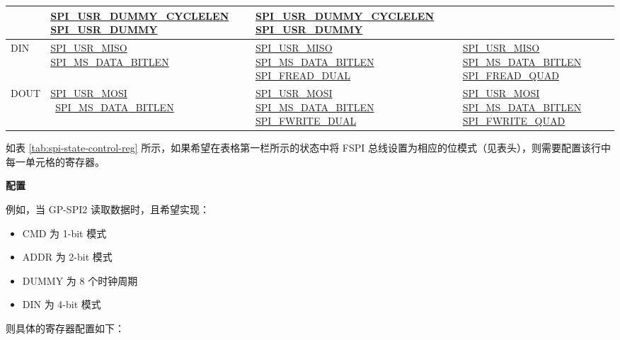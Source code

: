 \documentclass[main\_\_CN.tex]{subfiles}
\begin{document}
\begin{longtable}[c]{ |L{1.3cm}|L{4.8cm}|L{4.8cm}|L{4.8cm}| }
     &\hyperref[fielddesc:SPIUSRDUMMYCYCLELEN]{SPI\_USR\_DUMMY\_CYCLELEN}    \hyperref[fielddesc:SPIUSRDUMMY]{SPI\_USR\_DUMMY} &
    \hyperref[fielddesc:SPIUSRDUMMYCYCLELEN]{SPI\_USR\_DUMMY\_CYCLELEN}    \hyperref[fielddesc:SPIUSRDUMMY]{SPI\_USR\_DUMMY}\\
     \hline
DIN  &\hyperref[fielddesc:SPIUSRMISO]{SPI\_USR\_MISO}
      \hyperref[fielddesc:SPIMSDATABITLEN]{SPI\_MS\_DATA\_BITLEN}
     &\hyperref[fielddesc:SPIUSRMISO]{SPI\_USR\_MISO}
     \hyperref[fielddesc:SPIMSDATABITLEN]{SPI\_MS\_DATA\_BITLEN}
    \hyperref[fielddesc:SPIFREADDUAL]{SPI\_FREAD\_DUAL}
     &\hyperref[fielddesc:SPIUSRMISO]{SPI\_USR\_MISO}
     \hyperref[fielddesc:SPIMSDATABITLEN]{SPI\_MS\_DATA\_BITLEN}
    \hyperref[fielddesc:SPIFREADQUAD]{SPI\_FREAD\_QUAD}\\
     \hline
DOUT &\hyperref[fielddesc:SPIUSRMOSI]{SPI\_USR\_MOSI}       \
      \hyperref[fielddesc:SPIMSDATABITLEN]{SPI\_MS\_DATA\_BITLEN}
     &\hyperref[fielddesc:SPIUSRMOSI]{SPI\_USR\_MOSI}
     \hyperref[fielddesc:SPIMSDATABITLEN]{SPI\_MS\_DATA\_BITLEN}      \hyperref[fielddesc:SPIFWRITEDUAL]{SPI\_FWRITE\_DUAL} &
    \hyperref[fielddesc:SPIUSRMOSI]{SPI\_USR\_MOSI}
     \hyperref[fielddesc:SPIMSDATABITLEN]{SPI\_MS\_DATA\_BITLEN}      \hyperref[fielddesc:SPIFWRITEQUAD]{SPI\_FWRITE\_QUAD} \\
     \hline
\end{longtable}

如表 \ref{tab:spi-state-control-reg} 所示，如果希望在表格第一栏所示的状态中将 FSPI 总线设置为相应的位模式（见表头），则需要配置该行中每一单元格的寄存器。

\textbf{配置}

例如，当 GP-SPI2 读取数据时，且希望实现：
\begin{itemize}
    \item CMD 为 1-bit 模式
    \item ADDR 为 2-bit 模式
    \item DUMMY 为 8 个时钟周期
    \item DIN 为 4-bit 模式
\end{itemize}
则具体的寄存器配置如下：
\end{document}
